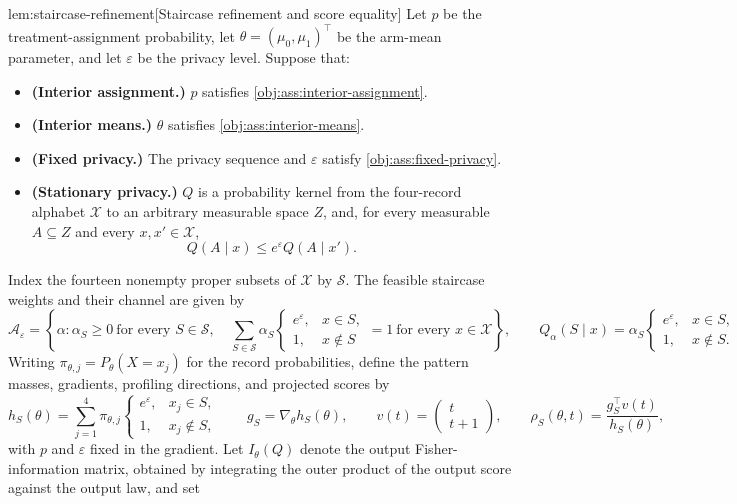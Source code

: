 \documentclass[11pt]{article}
\begin{document}
\begin{lemmav}{lem:staircase-refinement}[Staircase refinement and score equality]
Let \(p\) be the treatment-assignment probability, let \(\theta=(\mu_0,\mu_1)^\top\) be the arm-mean parameter, and let \(\varepsilon\) be the privacy level. Suppose that:
\begin{itemize}
\item \textbf{(Interior assignment.)} \(p\) satisfies \cref{obj:ass:interior-assignment}.
\item \textbf{(Interior means.)} \(\theta\) satisfies \cref{obj:ass:interior-means}.
\item \textbf{(Fixed privacy.)} The privacy sequence and \(\varepsilon\) satisfy \cref{obj:ass:fixed-privacy}.
\item \textbf{(Stationary privacy.)} \(Q\) is a probability kernel from the four-record alphabet \(\mathcal X\) to an arbitrary measurable space \(Z\), and, for every measurable \(A\subseteq Z\) and every \(x,x'\in\mathcal X\),
\[
Q(A\mid x)\le e^\varepsilon Q(A\mid x').
\]
\end{itemize}
Index the fourteen nonempty proper subsets of \(\mathcal X\) by \(\mathcal S\). The feasible staircase weights and their channel are given by
\[
\mathcal A_\varepsilon
=
\left\{
\alpha:
\alpha_S\ge0\ \text{for every }S\in\mathcal S,\quad
\sum_{S\in\mathcal S}\alpha_S
\begin{cases}
e^\varepsilon,&x\in S,\\
1,&x\notin S
\end{cases}
=1\ \text{for every }x\in\mathcal X
\right\},
\qquad
Q_\alpha(S\mid x)=\alpha_S
\begin{cases}
e^\varepsilon,&x\in S,\\
1,&x\notin S.
\end{cases}
\]
Writing \(\pi_{\theta,j}=P_\theta(X=x_j)\) for the record probabilities, define the pattern masses, gradients, profiling directions, and projected scores by
\[
h_S(\theta)
=
\sum_{j=1}^{4}\pi_{\theta,j}
\begin{cases}
e^\varepsilon,&x_j\in S,\\
1,&x_j\notin S,
\end{cases}
\qquad
g_S=\nabla_\theta h_S(\theta),
\qquad
v(t)=\begin{pmatrix}t\\t+1\end{pmatrix},
\qquad
\rho_S(\theta,t)=\frac{g_S^\top v(t)}{h_S(\theta)},
\]
with \(p\) and \(\varepsilon\) fixed in the gradient. Let \(I_\theta(Q)\) denote the output Fisher-information matrix, obtained by integrating the outer product of the output score against the output law, and set

\end{lemmav}
\end{document}
